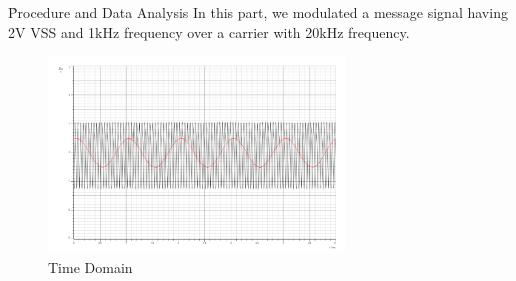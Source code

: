 \documentclass[12pt]{article}
\begin{document}
\h{Procedure and Data Analysis}
In this part, we modulated a message signal having 2V VSS and 1kHz frequency over a carrier with 20kHz frequency.
\begin{figure}[H]
    \centering
    \includegraphics[width=0.7\textwidth]{assets/time_domain.png}
    \caption{Time Domain}
\end{figure}
\end{document}
